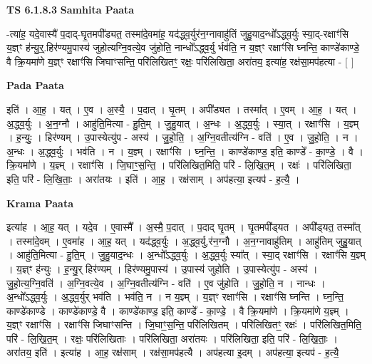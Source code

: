 \documentclass[17pt]{extarticle}
\begin{document}
\textbf{TS 6.1.8.3 } \newline
\textbf{Samhita Paata} \newline

-त्या॑ह॒ यदे॒वास्यै॑ प॒दाद्-घृ॒तमपी᳚ड्यत॒ तस्मा॑दे॒वमा॑ह॒ यद॑द्ध्व॒र्युर॑न॒ग्नावाहु॑तिं जुहु॒याद॒न्धो᳚ऽद्ध्व॒र्युः स्या॒द्-रक्षाꣳ॑सि य॒ज्ञ्ꣳ ह॑न्यु॒र्॒.हिर॑ण्यमु॒पास्य॑ जुहोत्यग्नि॒वत्ये॒व जु॑होति॒ नान्धो᳚ऽद्ध्व॒र्यु र्भव॑ति॒ न य॒ज्ञ्ꣳ रक्षाꣳ॑सि घ्नन्ति॒ काण्डे॑काण्डे॒ वै क्रि॒यमा॑णे य॒ज्ञ्ꣳ रक्षाꣳ॑सि जिघाꣳसन्ति॒ परि॑लिखितꣳ॒॒ रक्षः॒ परि॑लिखिता॒ अरा॑तय॒ इत्या॑ह॒ रक्ष॑सा॒मप॑हत्या - [  ] \newline

\textbf{Pada Paata} \newline

इति॑ । आ॒ह॒ । यत् । ए॒व । अ॒स्यै॒ । प॒दात् । घृ॒तम् । अपी᳚ड्यत । तस्मा᳚त् । ए॒वम् । आ॒ह॒ । यत् । अ॒द्ध्व॒र्युः । अ॒न॒ग्नौ । आहु॑ति॒मित्या - हु॒ति॒म् । जु॒हु॒यात् । अ॒न्धः । अ॒द्ध्व॒र्युः । स्या॒त् । रक्षाꣳ॑सि । य॒ज्ञ्म् । ह॒न्युः॒ । हिर॑ण्यम् । उ॒पास्येत्यु॑प - अस्य॑ । जु॒हो॒ति॒ । अ॒ग्नि॒वतीत्य॑ग्नि - वति॑ । ए॒व । जु॒हो॒ति॒ । न । अ॒न्धः । अ॒द्ध्व॒र्युः । भव॑ति । न । य॒ज्ञ्म् । रक्षाꣳ॑सि । घ्न॒न्ति॒ । काण्डे॑काण्ड॒ इति॒ काण्डे᳚ - का॒ण्डे॒ । वै । क्रि॒यमा॑णे । य॒ज्ञ्म् । रक्षाꣳ॑सि । जि॒घाꣳ॒॒स॒न्ति॒ । परि॑लिखित॒मिति॒ परि॑ - लि॒खि॒त॒म् । रक्षः॑ । परि॑लिखिता॒ इति॒ परि॑ - लि॒खि॒ताः॒ । अरा॑तयः । इति॑ । आ॒ह॒ । रक्ष॑साम् । अप॑हत्या॒ इत्यप॑ - ह॒त्यै॒ ।  \newline


\textbf{Krama Paata} \newline

इत्या॑ह । आ॒ह॒ यत् । यदे॒व । ए॒वास्मै᳚ । अ॒स्मै॒ प॒दात् । प॒दाद् घृ॒तम् । घृ॒तमपी᳚ड्‍यत । अपी᳚ड्‍यत॒ तस्मा᳚त् । तस्मा॑दे॒वम् । ए॒वमा॑ह । आ॒ह॒ यत् । यद॑द्ध्व॒र्युः । अ॒द्ध्व॒र्यु,र॑न॒ग्नौ । अ॒न॒ग्नावाहु॑तिम् । आहु॑तिम् जुहु॒यात् । आहु॑ति॒मित्या - हु॒ति॒म् । जु॒हु॒याद॒न्धः । अ॒न्धो᳚ऽद्ध्व॒र्युः । अ॒द्ध्व॒र्युः स्या᳚त् । स्या॒द् रक्षाꣳ॑सि । रक्षाꣳ॑सि य॒ज्ञ्म् । य॒ज्ञ्ꣳ ह॑न्युः । ह॒न्यु॒र् हिर॑ण्यम् । हिर॑ण्यमु॒पास्य॑ । उ॒पास्य॑ जुहोति । उ॒पास्येत्यु॑प - अस्य॑ । जु॒हो॒त्य॒ग्नि॒वति॑ । अ॒ग्नि॒वत्ये॒व । अ॒ग्नि॒वतीत्य॑ग्नि - वति॑ । ए॒व जु॑होति । जु॒हो॒ति॒ न । नान्धः । अ॒न्धो᳚ऽद्ध्व॒र्युः । अ॒द्ध्व॒र्युर् भव॑ति । भव॑ति॒ न । न य॒ज्ञ्म् । य॒ज्ञ्ꣳ रक्षाꣳ॑सि । रक्षाꣳ॑सि घ्नन्ति । घ्न॒न्ति॒ काण्डे॑काण्डे । काण्डे॑काण्डे॒ वै । काण्डे॑काण्ड॒ इति॒ काण्डे᳚ - का॒ण्डे॒ । वै क्रि॒यमा॑णे । क्रि॒यमा॑णे य॒ज्ञ्म् । य॒ज्ञ्ꣳ रक्षाꣳ॑सि । रक्षाꣳ॑सि जिघाꣳसन्ति । जि॒घाꣳ॒॒स॒न्ति॒ परि॑लिखितम् । परि॑लिखितꣳ॒॒ रक्षः॑ । परि॑लिखित॒मिति॒ परि॑ - लि॒खि॒त॒म् । रक्षः॒ परि॑लिखिताः । परि॑लिखिता॒ अरा॑तयः । परि॑लिखिता॒ इति॒ परि॑ - लि॒खि॒ताः॒ । अरा॑तय॒ इति॑ । इत्या॑ह । आ॒ह॒ रक्ष॑साम् । रक्ष॑सा॒मप॑हत्यै । अप॑हत्या इ॒दम् । अप॑हत्या॒ इत्यप॑ - ह॒त्यै॒ \newline
\end{document}
